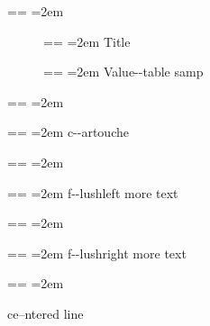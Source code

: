 \documentclass{book}
\makeatletter
\newcommand\GNUTexinfotablestylesamp[1]{\ifstrempty{#1}{}{{`\texttt{#1}'}}}%
\newenvironment{GNUTexinfopreformatted}{%
  \par\obeylines\obeyspaces\frenchspacing
  \parskip=\z@\parindent=\z@}{}
\makeatother
\begin{document}
\begin{GNUTexinfopreformatted}
\leftskip=2em\relax\ttfamily%

\end{GNUTexinfopreformatted}
\begin{description}
\item[] \begin{GNUTexinfopreformatted}
\leftskip=2em\relax\ttfamily%
Title
\end{GNUTexinfopreformatted}
\item[{\parbox[b]{\linewidth}{%
\GNUTexinfotablestylesamp{a{-}{-}samp}\\
\GNUTexinfotablestylesamp{a2{-}{-}samp}}}]
\begin{GNUTexinfopreformatted}
\leftskip=2em\relax\ttfamily%
Value{-}{-}table samp
\end{GNUTexinfopreformatted}
\end{description}
\begin{GNUTexinfopreformatted}
\leftskip=2em\relax\ttfamily%

\end{GNUTexinfopreformatted}
\begin{mdframed}[style=GNUTexinfocartouche]
\begin{GNUTexinfopreformatted}
\leftskip=2em\relax\ttfamily%
c{-}{-}artouche
\end{GNUTexinfopreformatted}
\end{mdframed}
\begin{GNUTexinfopreformatted}
\leftskip=2em\relax\ttfamily%

\end{GNUTexinfopreformatted}
\begin{GNUTexinfopreformatted}
\leftskip=2em\relax\ttfamily%
f{-}{-}lushleft
more text
\end{GNUTexinfopreformatted}
\begin{GNUTexinfopreformatted}
\leftskip=2em\relax\ttfamily%

\end{GNUTexinfopreformatted}
\begin{GNUTexinfopreformatted}
\leftskip=2em\relax\ttfamily%
f{-}{-}lushright
more text
\end{GNUTexinfopreformatted}
\begin{GNUTexinfopreformatted}
\leftskip=2em\relax\ttfamily%

\end{GNUTexinfopreformatted}
\begin{center}
ce--ntered line
\end{center}
\end{document}
